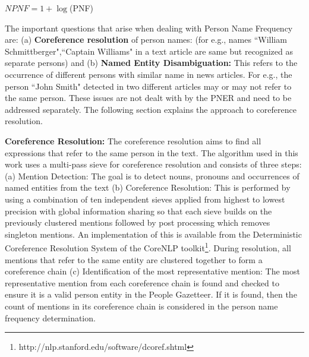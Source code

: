 \begin{center}
$NPNF=	1+\log$(PNF)
\end{center}

The important questions that arise when dealing with Person Name Frequency are: (a) \textbf{Coreference resolution} of person names: (for e.g., names ``William Schmittberger",``Captain Williams" in a text article are same but recognized as separate persons) and (b) \textbf{Named Entity Disambiguation:} This refers to the occurrence of different persons with similar name in news articles. For e.g., the person ``John Smith" detected in two different articles may or may not refer to the same person. These issues are not dealt with by the PNER and need to be addressed separately. 
The following section explains the approach to coreference resolution.


\noindent \textbf{Coreference Resolution: } The coreference resolution aims to find all expressions that refer to the same person in the text. 
The algorithm used in this work uses a multi-pass sieve for coreference resolution\cite{lee2013deterministic} and consists of three steps: (a) Mention Detection: The goal is to  detect nouns, pronouns and occurrences of named entities from the text (b) Coreference Resolution: This is performed by using a combination of ten independent sieves applied from highest to lowest precision with global information sharing so that each sieve builds on the previously clustered mentions followed by post processing which removes singleton mentions. An implementation of this is available from the Deterministic Coreference Resolution System of the CoreNLP toolkit\footnote{http://nlp.stanford.edu/software/dcoref.shtml}. During resolution, all mentions that refer to the same entity are clustered together to form a coreference chain (c) Identification of the most representative mention: The most representative mention from each coreference chain is found and checked to ensure it is a valid person entity in the People Gazetteer. If it is found, then the count of mentions in its coreference chain is considered in the person name frequency determination. 

